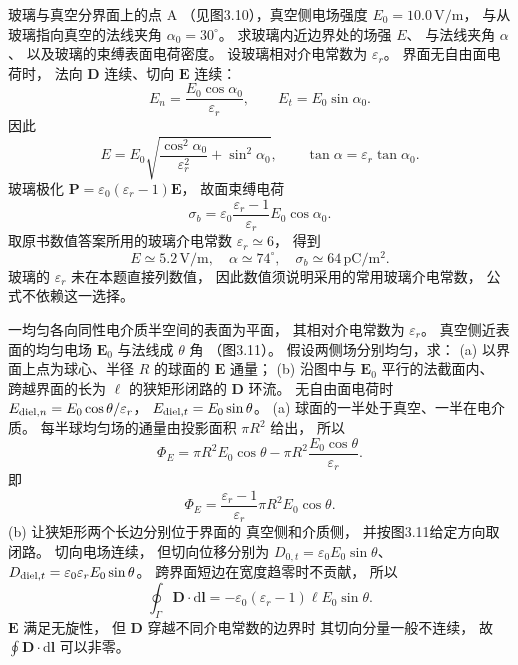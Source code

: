 玻璃与真空分界面上的点 A
（见图3.10），真空侧电场强度
$E_0=10.0\,\mathrm{V/m}$，
与从玻璃指向真空的法线夹角
$\alpha_0=30^\circ$。
求玻璃内近边界处的场强 $E$、
与法线夹角 $\alpha$、
以及玻璃的束缚表面电荷密度。
\exsolution
设玻璃相对介电常数为 $\varepsilon_r$。
界面无自由面电荷时，
法向 $\bm D$ 连续、切向 $\bm E$ 连续：
\[
E_n=\frac{E_0\cos\alpha_0}{\varepsilon_r},
\qquad E_t=E_0\sin\alpha_0.
\]
因此
\[
\boxed{E=E_0\sqrt{
\frac{\cos^2\alpha_0}{\varepsilon_r^2}
+\sin^2\alpha_0}},
\qquad
\boxed{\tan\alpha=\varepsilon_r\tan\alpha_0}.
\]
玻璃极化
$\bm P=\varepsilon_0(\varepsilon_r-1)\bm E$，
故面束缚电荷
\[
\boxed{\sigma_b=
\varepsilon_0\frac{\varepsilon_r-1}{\varepsilon_r}
E_0\cos\alpha_0}.
\]
取原书数值答案所用的玻璃介电常数
$\varepsilon_r\simeq6$，
得到
\[
\boxed{E\simeq5.2\,\mathrm{V/m}},\quad
\boxed{\alpha\simeq74^\circ},\quad
\boxed{\sigma_b\simeq64\,\mathrm{pC/m^2}}.
\]
\excheck 玻璃的 $\varepsilon_r$ 未在本题直接列数值，
因此数值须说明采用的常用玻璃介电常数，
公式不依赖这一选择。

一均匀各向同性电介质半空间的表面为平面，
其相对介电常数为 $\varepsilon_r$。
真空侧近表面的均匀电场
$\bm E_0$ 与法线成 $\theta$ 角
（图3.11）。
假设两侧场分别均匀，求：
(a) 以界面上点为球心、半径 $R$ 的球面的
$\bm E$ 通量；
(b) 沿图中与 $\bm E_0$ 平行的法截面内、
跨越界面的长为 $\ell$ 的狭矩形闭路的
$\bm D$ 环流。
\exsolution
无自由面电荷时
$E_{{\rm diel},n}=E_0\cos\theta/\varepsilon_r$，
$E_{{\rm diel},t}=E_0\sin\theta$。
(a) 球面的一半处于真空、一半在电介质。
每半球均匀场的通量由投影面积
$\pi R^2$ 给出，
所以
\[
\Phi_E=
\pi R^2E_0\cos\theta-
\pi R^2\frac{E_0\cos\theta}{\varepsilon_r}.
\]
即
\[
\boxed{\Phi_E=
\frac{\varepsilon_r-1}{\varepsilon_r}
\pi R^2 E_0\cos\theta}.
\]
(b) 让狭矩形两个长边分别位于界面的
真空侧和介质侧，
并按图3.11给定方向取闭路。
切向电场连续，
但切向位移分别为
$D_{0,t}=\varepsilon_0E_0\sin\theta$、
$D_{{\rm diel},t}=\varepsilon_0\varepsilon_rE_0\sin\theta$。
跨界面短边在宽度趋零时不贡献，
所以
\[
\boxed{\oint_\Gamma\bm D\cdot\mathrm d\bm l
=-\varepsilon_0(\varepsilon_r-1)
\ell E_0\sin\theta}.
\]
\excheck $\bm E$ 满足无旋性，
但 $\bm D$ 穿越不同介电常数的边界时
其切向分量一般不连续，
故 $\oint\bm D\cdot\mathrm d\bm l$
可以非零。

